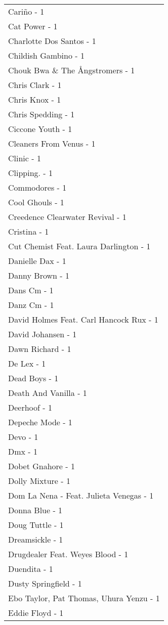 \documentclass[
]{article}
\begin{document}
\begin{longtable}{l}
Cariño - 1 \\ 
Cat Power - 1 \\ 
Charlotte Dos Santos - 1 \\ 
Childish Gambino - 1 \\ 
Chouk Bwa \& The Ångstromers - 1 \\ 
Chris Clark - 1 \\ 
Chris Knox - 1 \\ 
Chris Spedding - 1 \\ 
Ciccone Youth - 1 \\ 
Cleaners From Venus - 1 \\ 
Clinic - 1 \\ 
Clipping. - 1 \\ 
Commodores - 1 \\ 
Cool Ghouls - 1 \\ 
Creedence Clearwater Revival - 1 \\ 
Cristina - 1 \\ 
Cut Chemist Feat. Laura Darlington - 1 \\ 
Danielle Dax - 1 \\ 
Danny Brown - 1 \\ 
Dans Cm - 1 \\ 
Danz Cm - 1 \\ 
David Holmes Feat. Carl Hancock Rux - 1 \\ 
David Johansen - 1 \\ 
Dawn Richard - 1 \\ 
De Lex - 1 \\ 
Dead Boys - 1 \\ 
Death And Vanilla - 1 \\ 
Deerhoof - 1 \\ 
Depeche Mode - 1 \\ 
Devo - 1 \\ 
Dmx - 1 \\ 
Dobet Gnahore - 1 \\ 
Dolly Mixture - 1 \\ 
Dom La Nena - Feat. Julieta Venegas - 1 \\ 
Donna Blue - 1 \\ 
Doug Tuttle - 1 \\ 
Dreamsickle - 1 \\ 
Drugdealer Feat. Weyes Blood - 1 \\ 
Duendita - 1 \\ 
Dusty Springfield - 1 \\ 
Ebo Taylor, Pat Thomas, Uhura Yenzu - 1 \\ 
Eddie Floyd - 1 \\ 

\end{longtable}
\end{document}
